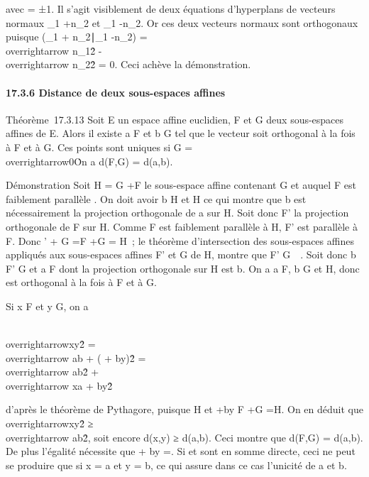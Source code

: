 \documentclass[]{article}
\begin{document}
avec \epsilon = ±1. Il s'agit visiblement de deux équations d'hyperplans de
vecteurs normaux \overrightarrown_1
+\overrightarrow n_2 et
\overrightarrown_1
-\overrightarrow n_2. Or ces deux vecteurs
normaux sont orthogonaux puisque
(\overrightarrown_1
+\overrightarrow
n_2∣\overrightarrown_1
-\overrightarrow n_2)
=\\overrightarrow
n_1\^2
-\\overrightarrow
n_2\^2 = 0. Ceci achève la
démonstration.

\paragraph{17.3.6 Distance de deux sous-espaces affines}

Théorème~17.3.13 Soit E un espace affine euclidien, F et G deux
sous-espaces affines de E. Alors il existe a \in F et b \in G tel que le
vecteur \overrightarrowab soit orthogonal à la fois à
F et à G. Ces points sont uniques si \overrightarrowF
\bigcap\overrightarrow G =
\\overrightarrow0\.
On a d(F,G) = d(a,b).

Démonstration Soit H = G +\overrightarrow F le
sous-espace affine contenant G et auquel F est faiblement parallèle . On
doit avoir b \in H et \overrightarrowab \bot H ce qui
montre que b est nécessairement la projection orthogonale de a sur H.
Soit donc F' la projection orthogonale de F sur H. Comme F est
faiblement parallèle à H, F' est parallèle à F. Donc
\overrightarrowF' +\overrightarrow
G =\overrightarrow F
+\overrightarrow G =\overrightarrow
H~; le théorème d'intersection des sous-espaces affines appliqués aux
sous-espaces affines F' et G de H, montre que F' \bigcap
G\neq~\varnothing~. Soit donc b \in F' \bigcap G et a \in F dont la
projection orthogonale sur H est b. On a a \in F, b \in G et
\overrightarrowab \bot H, donc
\overrightarrowab est orthogonal à la fois à F et à
G.

Si x \in F et y \in G, on a

\\overrightarrowxy\^2
=\\overrightarrow ab +
(\overrightarrowxa
+\overrightarrow
by)\^2
=\\overrightarrow
ab\^2
+\\overrightarrow xa
+\overrightarrow
by\^2

d'après le théorème de Pythagore, puisque
\overrightarrowab \bot\overrightarrow
H et \overrightarrowxa
+\overrightarrow by \in\overrightarrow
F +\overrightarrow G
=\overrightarrow H. On en déduit que
\\overrightarrowxy\^2
≥\\overrightarrow
ab\^2, soit encore d(x,y) ≥ d(a,b).
Ceci montre que d(F,G) = d(a,b). De plus l'égalité nécessite que
\overrightarrowxa +\overrightarrow
by =. Si
\overrightarrowF et
\overrightarrowG sont en somme directe, ceci ne peut
se produire que si x = a et y = b, ce qui assure dans ce cas l'unicité
de a et b.
\end{document}
